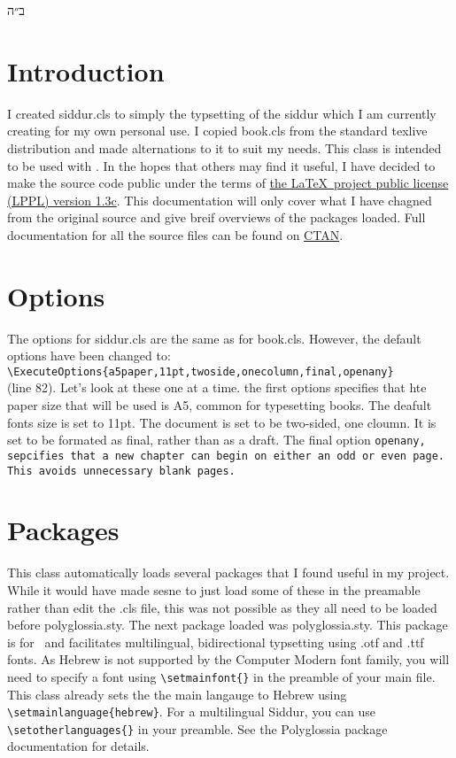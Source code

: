 \documentclass[12pt]{article}
\begin{document}
	\begin{hebrew}\noindent ב״ה\end{hebrew}
	\tableofcontents
	\section{Introduction}
	I created siddur.cls to simply the typsetting of the siddur which I am currently creating for my own personal use. I copied book.cls from the standard texlive distribution and made alternations to it to suit my needs. This class is intended to be used with \XeLaTeX. In the hopes that others may find it useful, I have decided to make the source code public under the terms of \href{https://www.latex-project.org/lppl.txt}{the \LaTeX\ project public license (LPPL) version 1.3c}. This documentation will only cover what I have chagned from the original source and give breif overviews of the packages loaded. Full documentation for all the source files can be found on \href{https://ctan.org/?lang=en}{CTAN}.
	\section{Options}
	The options for siddur.cls are the same as for book.cls. However, the default options have been changed to:\\\verb|\ExecuteOptions{a5paper,11pt,twoside,onecolumn,final,openany}|\\(line 82). Let's look at these one at a time. the first options specifies that hte paper size that will be used is A5, common for typesetting books. The deafult fonts size is set to 11pt. The document is set to be two-sided, one cloumn. It is set to be formated as final, rather than as a draft. The final option \tt openany\rm, sepcifies that a new chapter can begin on either an odd or even page. This avoids unnecessary blank pages.
	\section{Packages}
	This class automatically loads several packages that I found useful in my project. While it would have made sesne to just load some of these in the preamable rather than edit the .cls file, this was not possible as they all need to be loaded before polyglossia.sty.
	The next package loaded was polyglossia.sty. This package is for \XeLaTeX\ and facilitates multilingual, bidirectional typsetting using .otf and .ttf fonts. As Hebrew is not supported by the Computer Modern font family, you will need to specify a font using \verb|\setmainfont{}| in the preamble of your main file. This class already sets the the main langauge to Hebrew using \verb|\setmainlanguage{hebrew}|. For a multilingual Siddur, you can use \verb|\setotherlanguages{}| in your preamble. See the Polyglossia package documentation for details.
\end{document}
